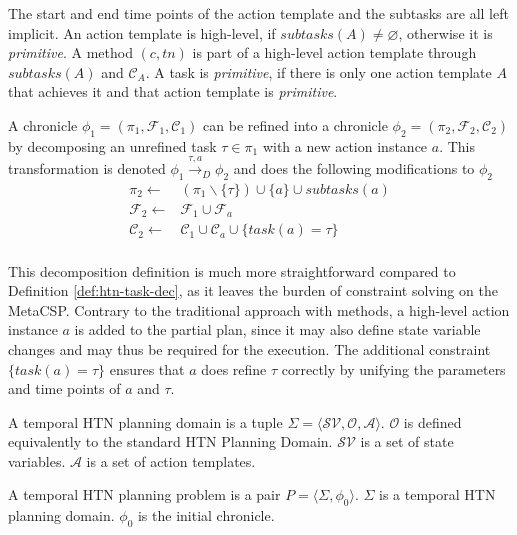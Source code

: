 The start and end time points of the action template and the subtasks are all left implicit.
An action template is high-level, if $subtasks(A) \neq \varnothing$, otherwise it is \textit{primitive}.
A method $(c,tn)$ is part of a high-level action template through $subtasks(A)$ and $\mathcal{C}_A$.
A task is \textit{primitive}, if there is only one action template $A$ that achieves it and that action template is \textit{primitive}.

\begin{definition}
  A chronicle $\phi_1 = (\pi_1,\mathcal{F}_1,\mathcal{C}_1)$ can be refined into a chronicle $\phi_2 = (\pi_2,\mathcal{F}_2,\mathcal{C}_2)$ by decomposing an unrefined task $\tau \in \pi_1$ with a new action instance $a$. This transformation is denoted $\phi_1 \xrightarrow{\tau,a}_D \phi_2$ and does the following modifications to $\phi_2$
  \begin{align*}
    \pi_2 \leftarrow & (\pi_1  \backslash \{\tau\}) \cup \{a\} \cup subtasks(a) \\
    \mathcal{F}_2 \leftarrow & \mathcal{F}_1 \cup \mathcal{F}_a \\
    \mathcal{C}_2 \leftarrow & \mathcal{C}_1 \cup \mathcal{C}_a \cup \{task(a) = \tau\} \\
  \end{align*}
  \label{def:htn-task-dec-fape}
\end{definition}

This decomposition definition is much more straightforward compared to Definition \ref{def:htn-task-dec}, as it leaves the burden of constraint solving on the MetaCSP.
Contrary to the traditional approach with methods, a high-level action instance $a$ is added to the partial plan, since it may also define state variable changes and may thus be required for the execution.
The additional constraint $\{task(a) = \tau\}$ ensures that $a$ does refine $\tau$ correctly by unifying the parameters and time points of $a$ and $\tau$.

\begin{definition}
  A temporal \ac{HTN} planning domain is a tuple $\Sigma = \langle \mathcal{SV},\mathcal{O},\mathcal{A} \rangle$.
  $\mathcal{O}$ is defined equivalently to the standard \ac{HTN} Planning Domain.
  $\mathcal{SV}$ is a set of state variables.
  $\mathcal{A}$ is a set of action templates.
\end{definition}

\begin{definition}
  A temporal \ac{HTN} planning problem is a pair $P = \langle \Sigma, \phi_0 \rangle$.
  $\Sigma$ is a temporal \ac{HTN} planning domain.
  $\phi_0$ is the initial chronicle.
\end{definition}

